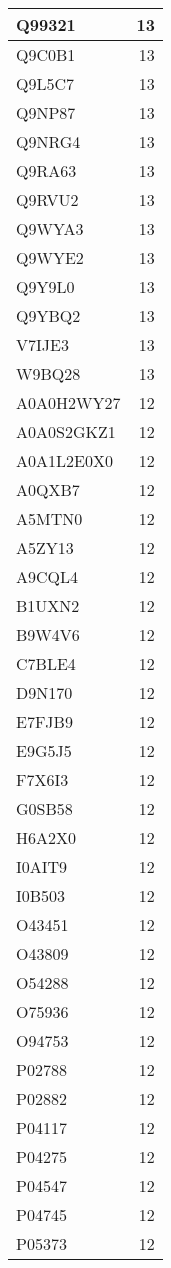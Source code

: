 \documentclass[
]{book}
\theoremstyle{definition}
\theoremstyle{definition}
\theoremstyle{definition}
\theoremstyle{definition}
\theoremstyle{remark}
\begin{document}
\begin{table}
\begin{tabular}{l|r}
\hline
Q99321 & 13\\
\hline
Q9C0B1 & 13\\
\hline
Q9L5C7 & 13\\
\hline
Q9NP87 & 13\\
\hline
Q9NRG4 & 13\\
\hline
Q9RA63 & 13\\
\hline
Q9RVU2 & 13\\
\hline
Q9WYA3 & 13\\
\hline
Q9WYE2 & 13\\
\hline
Q9Y9L0 & 13\\
\hline
Q9YBQ2 & 13\\
\hline
V7IJE3 & 13\\
\hline
W9BQ28 & 13\\
\hline
A0A0H2WY27 & 12\\
\hline
A0A0S2GKZ1 & 12\\
\hline
A0A1L2E0X0 & 12\\
\hline
A0QXB7 & 12\\
\hline
A5MTN0 & 12\\
\hline
A5ZY13 & 12\\
\hline
A9CQL4 & 12\\
\hline
B1UXN2 & 12\\
\hline
B9W4V6 & 12\\
\hline
C7BLE4 & 12\\
\hline
D9N170 & 12\\
\hline
E7FJB9 & 12\\
\hline
E9G5J5 & 12\\
\hline
F7X6I3 & 12\\
\hline
G0SB58 & 12\\
\hline
H6A2X0 & 12\\
\hline
I0AIT9 & 12\\
\hline
I0B503 & 12\\
\hline
O43451 & 12\\
\hline
O43809 & 12\\
\hline
O54288 & 12\\
\hline
O75936 & 12\\
\hline
O94753 & 12\\
\hline
P02788 & 12\\
\hline
P02882 & 12\\
\hline
P04117 & 12\\
\hline
P04275 & 12\\
\hline
P04547 & 12\\
\hline
P04745 & 12\\
\hline
P05373 & 12\\

\end{tabular}
\end{table}
\end{document}
